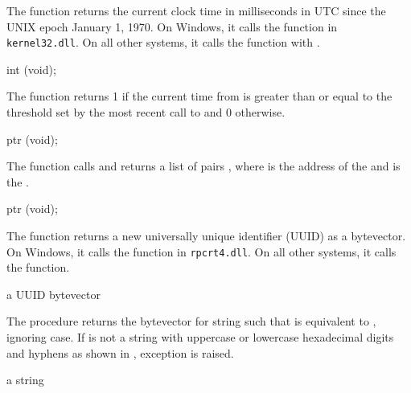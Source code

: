 The  function returns the current clock time in
milliseconds in UTC since the UNIX epoch January 1, 1970. On Windows,
it calls the  function in
\texttt{kernel32.dll}. On all other systems, it calls the
 function with .

\begin{function}
  int (void);
\end{function}

The  function returns 1 if the current time
from  is greater than or equal to the threshold set
by the most recent call to  and 0 otherwise.

\begin{function}
  ptr (void);
\end{function}

The  function calls  and
returns a list of pairs , where
 is the address of the  and 
is the .

\begin{function}
  ptr (void);
\end{function}

The  function returns a new universally unique
identifier (UUID) as a bytevector. On Windows, it calls the
 function in \texttt{rpcrt4.dll}. On all other
systems, it calls the  function.

\begin{procedure}
\end{procedure}
\returns{} a UUID bytevector

The  procedure returns the bytevector 
for string  such that  is
equivalent to , ignoring case. If  is not a string with
uppercase or lowercase hexadecimal digits and hyphens as shown in
, exception 
is raised.

\begin{procedure}
\end{procedure}
\returns{} a string

